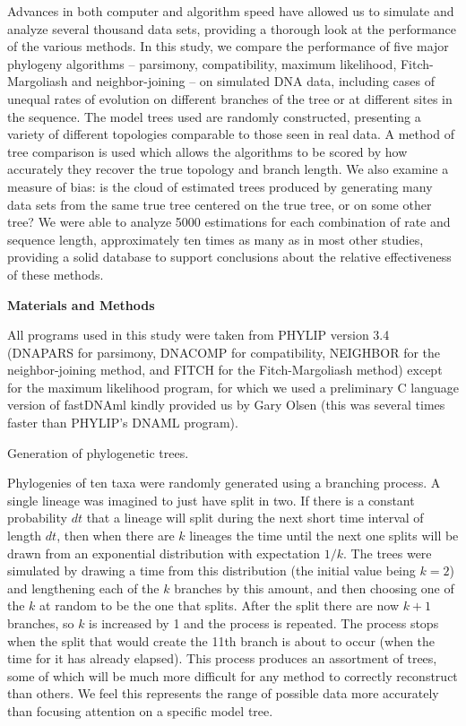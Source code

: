 	Advances in both computer and algorithm speed have allowed 
us to simulate and analyze several thousand data sets, providing a 
thorough look at the performance of the various methods.  In this 
study, we compare the performance of five major phylogeny 
algorithms -- parsimony, compatibility, maximum likelihood, Fitch-Margoliash 
and neighbor-joining -- on simulated DNA data, including 
cases of unequal rates of evolution on different branches of the tree 
or at different sites in the sequence.  The model trees used are
randomly constructed, presenting a variety of different topologies
comparable to those seen in real data.  A method of tree comparison 
is used which allows the algorithms to be scored by how accurately 
they recover the true topology and branch length.  We also examine 
a measure of bias:  is the cloud of estimated trees produced by
generating many data sets from the same true tree centered on the true
tree, or on some other tree?
We were able to analyze 5000 estimations for each 
combination of rate and sequence length, approximately ten times as 
many as in most other studies, providing a solid database to support 
conclusions about the relative effectiveness of these methods.

\newpage
\noindent
{\bf Materials and Methods}
\bigskip


	All programs used in this study were taken from PHYLIP 
version 3.4 (DNAPARS for parsimony, DNACOMP for compatibility,
NEIGHBOR for the neighbor-joining method, and FITCH for the Fitch-Margoliash 
method) except for the maximum likelihood program,
for which we used a preliminary C language version of fastDNAml
kindly provided us by Gary Olsen (this was several times faster than
PHYLIP's DNAML program). 
\bigskip

\bigskip

\noindent
Generation of phylogenetic trees.
\bigskip


  Phylogenies of ten taxa were randomly generated using a branching process.
A single lineage was imagined to just have split in two.  If there is a
constant probability $dt$ that a lineage will split during the next short
time interval of length $dt$, then when there are $k$ lineages the time until
the next one splits will be drawn from an exponential distribution with
expectation $1/k$.  The trees were simulated by drawing a time from this
distribution (the initial value being $k=2$) and lengthening each of the
$k$ branches by this amount, and then choosing one of the $k$ at random
to be the one that splits.  After the split there are now $k+1$ branches,
so $k$ is increased by 1 and the process is repeated.  The process stops when
the split that would create the 11th branch is about to occur (when the
time for it has already elapsed).  This process produces an assortment
of trees, some of which will be much more difficult for any method to
correctly reconstruct than others.  We feel this represents the range of
possible data more accurately than focusing attention on a specific
model tree.

